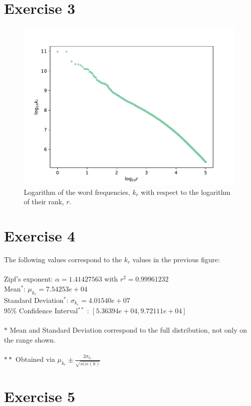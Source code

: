 \documentclass{article}
\begin{document}
\section{Exercise 3} 

\begin{figure}[h!]
\includegraphics[width=\linewidth]{Q03/zipfRanksLog.pdf}
\caption{Logarithm of the word frequencies, $k_r$ with respect to the logarithm of their rank, $r$. }
\label{fig:zipf}
\end{figure}

\section{Exercise 4}

The following values correspond to the $k_r$ values in the previous figure: \\
\\
Zipf's exponent: $\alpha = 1.41427563$ with $r^2 = 0.99961232$\\
Mean$^*$: $\mu_{k_r} = 7.54253e+04$\\
Standard Deviation$^*$: $\sigma_{k_r} = 4.01540e+07$\\
$95\%$ Confidence Interval$^{**}$ : $[5.36394e+04,9.72111e+04]$\\
\\
$*$ Mean and Standard Deviation correspond to the full distribution, not only on the range shown.\\
\\
$**$ Obtained via $\mu_{k_r} \pm \frac{2\sigma_{k_r}}{\sqrt{size(k)}}$ 

\section{Exercise 5} 
\end{document}
